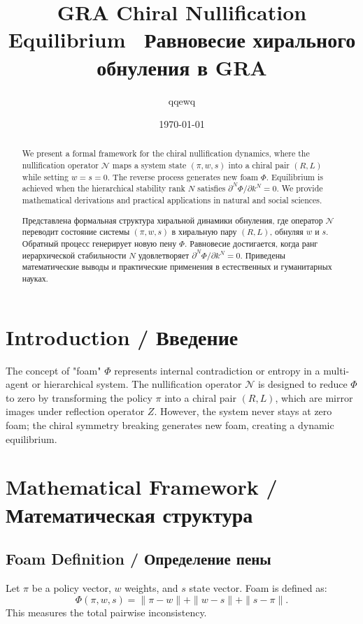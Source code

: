 \documentclass[12pt,a4paper]{article}
\title{GRA Chiral Nullification Equilibrium \ \medskip Равновесие хирального обнуления в GRA}
\author{qqewq}
\date{\today}
\begin{document}
\maketitle

\begin{abstract}
We present a formal framework for the chiral nullification dynamics, where the nullification operator $\mathcal{N}$ maps a system state $(\pi, w, s)$ into a chiral pair $(R, L)$ while setting $w=s=0$. The reverse process generates new foam $\Phi$. Equilibrium is achieved when the hierarchical stability rank $N$ satisfies $\partial^N \Phi / \partial k^N = 0$. We provide mathematical derivations and practical applications in natural and social sciences.

Представлена формальная структура хиральной динамики обнуления, где оператор $\mathcal{N}$ переводит состояние системы $(\pi, w, s)$ в хиральную пару $(R, L)$, обнуляя $w$ и $s$. Обратный процесс генерирует новую пену $\Phi$. Равновесие достигается, когда ранг иерархической стабильности $N$ удовлетворяет $\partial^N \Phi / \partial k^N = 0$. Приведены математические выводы и практические применения в естественных и гуманитарных науках.
\end{abstract}

\section{Introduction / Введение}
The concept of "foam" $\Phi$ represents internal contradiction or entropy in a multi-agent or hierarchical system. The nullification operator $\mathcal{N}$ is designed to reduce $\Phi$ to zero by transforming the policy $\pi$ into a chiral pair $(R, L)$, which are mirror images under reflection operator $Z$. However, the system never stays at zero foam; the chiral symmetry breaking generates new foam, creating a dynamic equilibrium.

\section{Mathematical Framework / Математическая структура}

\subsection{Foam Definition / Определение пены}
Let $\pi$ be a policy vector, $w$ weights, and $s$ state vector. Foam is defined as:
\begin{equation}
\Phi(\pi, w, s) = \|\pi - w\| + \|w - s\| + \|s - \pi\|.
\end{equation}
This measures the total pairwise inconsistency.
\end{document}
